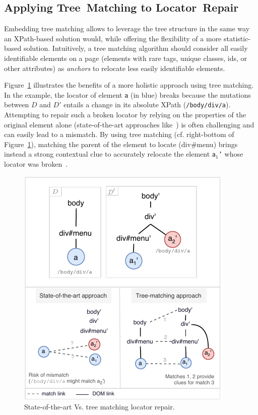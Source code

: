 \subsection{Applying Tree~Matching to Locator~Repair}
Embedding tree matching allows \erratum to leverage the tree structure in the same way an XPath-based solution would, while offering the flexibility of a more statistic-based solution.
Intuitively, a tree matching algorithm should consider all easily identifiable elements on a page (elements with rare tags, unique classes, ids, or other attributes) as \textit{anchors} to relocate less easily identifiable elements.

Figure~\ref{fig:holistic} illustrates the benefits of a more holistic approach using tree matching.
In the example, the locator of element \texttt{a} (in blue) breaks because the mutations between $D$ and $D'$ entails a change in its absolute XPath (\texttt{/body/div/a}).
Attempting to repair such a broken locator by relying on the properties of the original element alone (state-of-the-art approaches like~\cite{choudhary2011water,stocco2018visual}) is often challenging and can easily lead to a mismatch. 
By using tree matching (cf. right-bottom of Figure~\ref{fig:holistic}), matching the parent of the element to locate (\textsf{div\#menu}) brings instead a strong contextual clue to accurately relocate the element \texttt{a$_1$'} whose locator was broken~\cite{brisset2020sftm}.

\begin{figure}[]
    \centering
    \includegraphics[width=.8\linewidth]{erratum/holistic}
    \caption{State-of-the-art Vs. tree matching locator repair.}
    \label{fig:holistic}
\end{figure}

